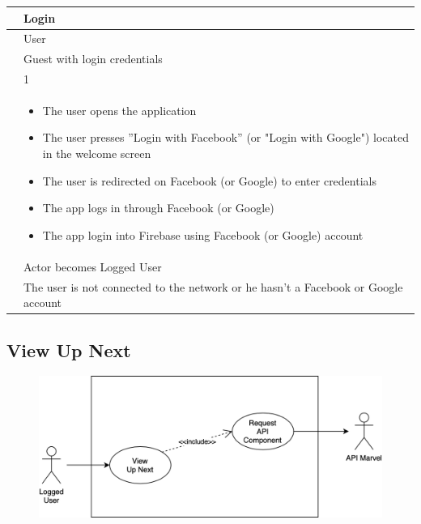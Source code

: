 {\renewcommand{\arraystretch}{2}
{\begin{center}
\begin{tabular}{ | m{4cm} | m{9cm} | } 
 \hline
 {\centering{\textbf{Name}}} & Login \\
 \hline
 {\centering{\textbf{Actor}}} & User \\
 \hline
 {\centering{\textbf{Entry Condition}}} & Guest with login credentials \\
 \hline
 {\centering{\textbf{Goal}}} & 1 \\
 \hline
 {\centering{\textbf{Event flow}}} & \begin{itemize}[leftmargin=*]
 	\item The user opens the application
	\item The user presses ”Login with Facebook” (or "Login with Google") located in the welcome screen
	\item The user is redirected on Facebook (or Google) to enter credentials
	\item The app logs in through Facebook (or Google)
	\item The app login into Firebase using Facebook (or Google) account 
	\end{itemize} \\	
 \hline
 {\centering{\textbf{Exit condition}}} & Actor becomes Logged User \\
 \hline
 {\centering{\textbf{Exceptions}}} & The user is not connected to the network or he hasn’t a Facebook or Google account \\
 \hline
\end{tabular}
\end{center}}

\clearpage

\subsection{View Up Next}
\begin{figure}[h]
\centering
\includegraphics[width=\textwidth]{img/usecases/viewupnext}
\end{figure}

}
